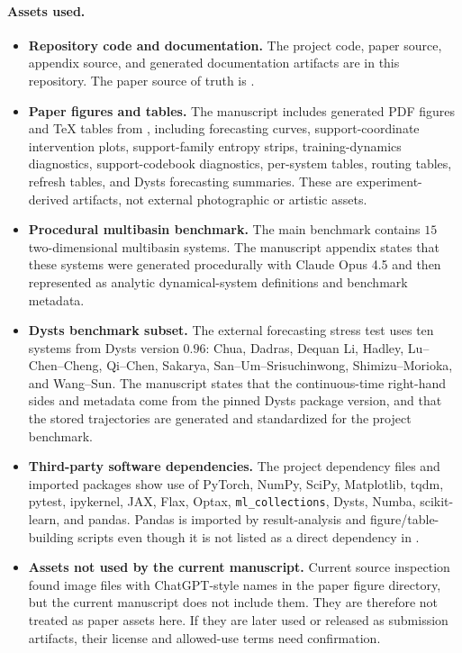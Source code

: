 \paragraph{Assets used.}
\begin{itemize}
  \item \textbf{Repository code and documentation.}
  The project code, paper source, appendix source, and generated documentation
  artifacts are in this repository. The paper source of truth is
  .

  \item \textbf{Paper figures and tables.}
  The manuscript includes generated PDF figures and TeX tables from
  , including forecasting curves,
  support-coordinate intervention plots, support-family entropy strips,
  training-dynamics diagnostics, support-codebook diagnostics, per-system
  tables, routing tables, refresh tables, and Dysts forecasting summaries. These
  are experiment-derived artifacts, not external photographic or artistic assets.

  \item \textbf{Procedural multibasin benchmark.}
  The main benchmark contains \(15\) two-dimensional multibasin systems. The
  manuscript appendix states that these systems were generated procedurally with
  Claude Opus 4.5 and then represented as analytic dynamical-system definitions
  and benchmark metadata.

  \item \textbf{Dysts benchmark subset.}
  The external forecasting stress test uses ten systems from Dysts version
  \(0.96\): Chua, Dadras, Dequan Li, Hadley, Lu--Chen--Cheng, Qi--Chen,
  Sakarya, San--Um--Srisuchinwong, Shimizu--Morioka, and Wang--Sun. The
  manuscript states that the continuous-time right-hand sides and metadata come
  from the pinned Dysts package version, and that the stored trajectories are
  generated and standardized for the project benchmark.

  \item \textbf{Third-party software dependencies.}
  The project dependency files and imported packages show use of PyTorch, NumPy,
  SciPy, Matplotlib, tqdm, pytest, ipykernel, JAX, Flax, Optax,
  \texttt{ml\_collections}, Dysts, Numba, scikit-learn, and pandas. Pandas is
  imported by result-analysis and figure/table-building scripts even though it
  is not listed as a direct dependency in .

  \item \textbf{Assets not used by the current manuscript.}
  Current source inspection found image files with ChatGPT-style names in the
  paper figure directory, but the current manuscript does not include them.
  They are therefore not treated as paper assets here. If they are later used or
  released as submission artifacts, their license and allowed-use terms need
  confirmation.
\end{itemize}

